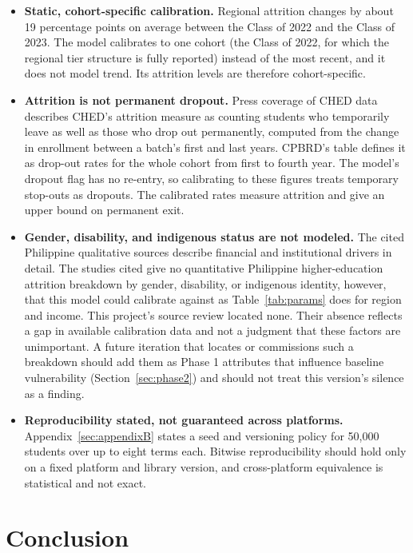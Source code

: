 \documentclass[11pt]{article}
\begin{document}
\begin{itemize}[topsep=2pt,itemsep=3pt,parsep=0pt]
\item \textbf{Static, cohort-specific calibration.} Regional attrition changes by about 19 percentage points on average between the Class of 2022 and the Class of 2023. The model calibrates to one cohort (the Class of 2022, for which the regional tier structure is fully reported) instead of the most recent, and it does not model trend. Its attrition levels are therefore cohort-specific.
\item \textbf{Attrition is not permanent dropout.} Press coverage of CHED data describes CHED's attrition measure as counting students who temporarily leave as well as those who drop out permanently, computed from the change in enrollment between a batch's first and last years. CPBRD's table defines it as drop-out rates for the whole cohort from first to fourth year. The model's dropout flag has no re-entry, so calibrating to these figures treats temporary stop-outs as dropouts. The calibrated rates measure attrition and give an upper bound on permanent exit.
\item \textbf{Gender, disability, and indigenous status are not modeled.} The cited Philippine qualitative sources \citep{cahilog2025,socioeconomic2024} describe financial and institutional drivers in detail. The studies cited give no quantitative Philippine higher-education attrition breakdown by gender, disability, or indigenous identity, however, that this model could calibrate against as Table~\ref{tab:params} does for region and income. This project's source review located none. Their absence reflects a gap in available calibration data and not a judgment that these factors are unimportant. A future iteration that locates or commissions such a breakdown should add them as Phase 1 attributes that influence baseline vulnerability (Section~\ref{sec:phase2}) and should not treat this version's silence as a finding.
\item \textbf{Reproducibility stated, not guaranteed across platforms.} Appendix~\ref{sec:appendixB} states a seed and versioning policy for 50,000 students over up to eight terms each. Bitwise reproducibility should hold only on a fixed platform and library version, and cross-platform equivalence is statistical and not exact.
\end{itemize}

\FloatBarrier
\section{Conclusion}
\label{sec:conclusion}
\end{document}
